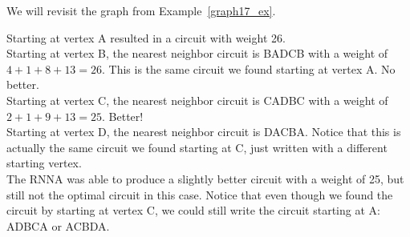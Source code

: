 \begin{example}{}{} %
We will revisit the graph from Example~\ref{graph17_ex}.\\
\begin{center}
\end{center}

Starting at vertex A resulted in a circuit with weight 26.\\

Starting at vertex B, the nearest neighbor circuit is BADCB with a weight of $4+1+8+13 = 26$.  This is the same circuit we found starting at vertex A.  No better.\\

Starting at vertex C, the nearest neighbor circuit is CADBC with a weight of $2+1+9+13 = 25$.  Better!\\

Starting at vertex D, the nearest neighbor circuit is DACBA.  Notice that this is actually the same circuit we found starting at C, just written with a different starting vertex.\\

The RNNA was able to produce a slightly better circuit with a weight of 25, but still not the optimal circuit in this case.  Notice that even though we found the circuit by starting at vertex C, we could still write the circuit starting at A:  ADBCA or ACBDA.
\end{example}


